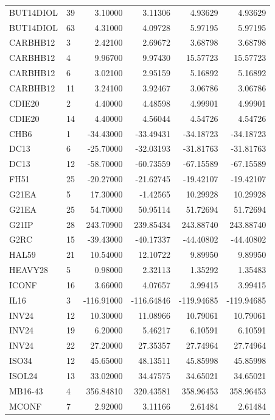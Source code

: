 {\begin{longtable}{llrrrr}
BUT14DIOL & 39 & 3.10000 & 3.11306 & 4.93629 & 4.93629 \\
BUT14DIOL & 63 & 4.31000 & 4.09728 & 5.97195 & 5.97195 \\
CARBHB12 & 3 & 2.42100 & 2.69672 & 3.68798 & 3.68798 \\
CARBHB12 & 4 & 9.96700 & 9.97430 & 15.57723 & 15.57723 \\
CARBHB12 & 6 & 3.02100 & 2.95159 & 5.16892 & 5.16892 \\
CARBHB12 & 11 & 3.24100 & 3.92467 & 3.06786 & 3.06786 \\
CDIE20 & 2 & 4.40000 & 4.48598 & 4.99901 & 4.99901 \\
CDIE20 & 14 & 4.40000 & 4.56044 & 4.54726 & 4.54726 \\
CHB6 & 1 & -34.43000 & -33.49431 & -34.18723 & -34.18723 \\
DC13 & 6 & -25.70000 & -32.03193 & -31.81763 & -31.81763 \\
DC13 & 12 & -58.70000 & -60.73559 & -67.15589 & -67.15589 \\
FH51 & 25 & -20.27000 & -21.62745 & -19.42107 & -19.42107 \\
G21EA & 5 & 17.30000 & -1.42565 & 10.29928 & 10.29928 \\
G21EA & 25 & 54.70000 & 50.95114 & 51.72694 & 51.72694 \\
G21IP & 28 & 243.70900 & 239.85434 & 243.88740 & 243.88740 \\
G2RC & 15 & -39.43000 & -40.17337 & -44.40802 & -44.40802 \\
HAL59 & 21 & 10.54000 & 12.10722 & 9.89950 & 9.89950 \\
HEAVY28 & 5 & 0.98000 & 2.32113 & 1.35292 & 1.35483 \\
ICONF & 16 & 3.66000 & 4.07657 & 3.99415 & 3.99415 \\
IL16 & 3 & -116.91000 & -116.64846 & -119.94685 & -119.94685 \\
INV24 & 12 & 10.30000 & 11.08966 & 10.79061 & 10.79061 \\
INV24 & 19 & 6.20000 & 5.46217 & 6.10591 & 6.10591 \\
INV24 & 22 & 27.20000 & 27.35357 & 27.74964 & 27.74964 \\
ISO34 & 12 & 45.65000 & 48.13511 & 45.85998 & 45.85998 \\
ISOL24 & 13 & 33.02000 & 34.47575 & 34.65021 & 34.65021 \\
MB16-43 & 4 & 356.84810 & 320.43581 & 358.96453 & 358.96453 \\
MCONF & 7 & 2.92000 & 3.11166 & 2.61484 & 2.61484 \\

\end{longtable}}
